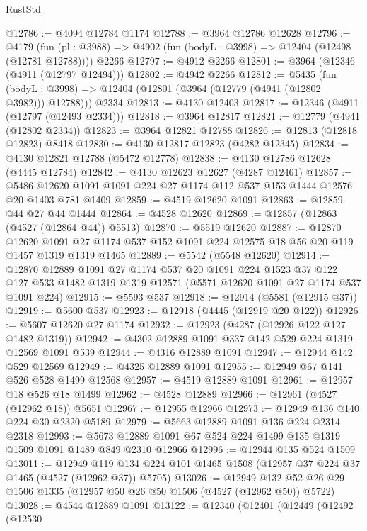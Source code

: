 \begin{lexlean}{RustStd}
\begin{coremodule}
{\begin{coremodule}
{{{{{{{{{{{{{{{{{{{{{{{{{{{{{{{{{{{{{{@12786 := @4094 @12784 @1174
@12788 := @3964 @12786 @12628
@12796 := @4179
    (fun (pl : @3988) => @4902 (fun (bodyL : @3998) => @12404 (@12498 (@12781 @12788))))
    @2266
@12797 := @4912 @2266
@12801 := @3964 (@12346 (@4911 (@12797 @12494)))
@12802 := @4942 @2266
@12812 := @5435
    (fun (bodyL : @3998) => @12404 (@12801 (@3964 (@12779 (@4941 (@12802 @3982))) @12788)))
    @2334
@12813 := @4130 @12403
@12817 := @12346 (@4911 (@12797 (@12493 @2334)))
@12818 := @3964 @12817
@12821 := @12779 (@4941 (@12802 @2334))
@12823 := @3964 @12821 @12788
@12826 := @12813 (@12818 @12823) @8418
@12830 := @4130 @12817 @12823 (@4282 @12345)
@12834 := @4130 @12821 @12788 (@5472 @12778)
@12838 := @4130 @12786 @12628 (@4445 @12784)
@12842 := @4130 @12623 @12627 (@4287 @12461)
@12857 := @5486 @12620 @1091 @1091 @224 @27 @1174 @112 @537 @153 @1444 @12576 @20 @1403 @781 @1409
@12859 := @4519 @12620 @1091
@12863 := @12859 @44 @27 @44 @1444
@12864 := @4528 @12620
@12869 := @12857 (@12863 (@4527 (@12864 @44)) @5513)
@12870 := @5519 @12620
@12887 := @12870
    @12620
    @1091
    @27
    @1174
    @537
    @152
    @1091
    @224
    @12575
    @18
    @56
    @20
    @119
    @1457
    @1319
    @1319
    @1465
@12889 := @5542 (@5548 @12620)
@12914 := @12870
    @12889
    @1091
    @27
    @1174
    @537
    @20
    @1091
    @224
    @1523
    @37
    @122
    @127
    @533
    @1482
    @1319
    @1319
    @12571
    (@5571 @12620 @1091 @27 @1174 @537 @1091 @224)
@12915 := @5593 @537
@12918 := @12914 (@5581 (@12915 @37))
@12919 := @5600 @537
@12923 := @12918 (@4445 (@12919 @20 @122))
@12926 := @5607 @12620 @27 @1174
@12932 := @12923 (@4287 (@12926 @122 @127 @1482 @1319))
@12942 := @4302 @12889 @1091 @337 @142 @529 @224 @1319 @12569 @1091 @539
@12944 := @4316 @12889 @1091
@12947 := @12944 @142 @529 @12569
@12949 := @4325 @12889 @1091
@12955 := @12949 @67 @141 @526 @528 @1499 @12568
@12957 := @4519 @12889 @1091
@12961 := @12957 @18 @526 @18 @1499
@12962 := @4528 @12889
@12966 := @12961 (@4527 (@12962 @18)) @5651
@12967 := @12955 @12966
@12973 := @12949 @136 @140 @224 @30 @2320 @5189
@12979 := @5663 @12889 @1091 @136 @224 @2314 @2318
@12993 := @5673 @12889 @1091 @67 @524 @224 @1499 @135 @1319 @1509 @1091 @1489 @849 @2310 @12966
@12996 := @12944 @135 @524 @1509
@13011 := @12949
    @119
    @134
    @224
    @101
    @1465
    @1508
    (@12957 @37 @224 @37 @1465 (@4527 (@12962 @37)) @5705)
@13026 := @12949 @132 @52 @26 @29 @1506 @1335 (@12957 @50 @26 @50 @1506 (@4527 (@12962 @50)) @5722)
@13028 := @4544 @12889 @1091
@13122 := @12340
    (@12401
      (@12449
        (@12492
          (@12530
}}}}}}}}}}}}}}}}}}}}}}}}}}}}}}}}}}}}}}
\end{coremodule}}
\end{coremodule}
\end{lexlean}
